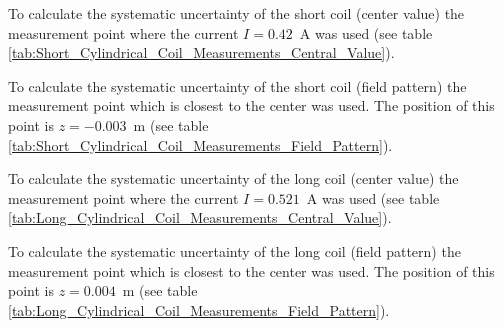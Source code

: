 To calculate the systematic uncertainty of the short coil (center value) the measurement point where the current $I=0.42$\ A was used (see table \ref{tab:Short_Cylindrical_Coil_Measurements_Central_Value}).

To calculate the systematic uncertainty of the short coil (field pattern) the measurement point which is closest to the center was used. The position of this point is $z=-0.003$\ m (see table \ref{tab:Short_Cylindrical_Coil_Measurements_Field_Pattern}).

To calculate the systematic uncertainty of the long coil (center value) the measurement point where the current $I=0.521$\ A was used (see table \ref{tab:Long_Cylindrical_Coil_Measurements_Central_Value}).

To calculate the systematic uncertainty of the long coil (field pattern) the measurement point which is closest to the center was used. The position of this point is $z=0.004$\ m (see table \ref{tab:Long_Cylindrical_Coil_Measurements_Field_Pattern}).
